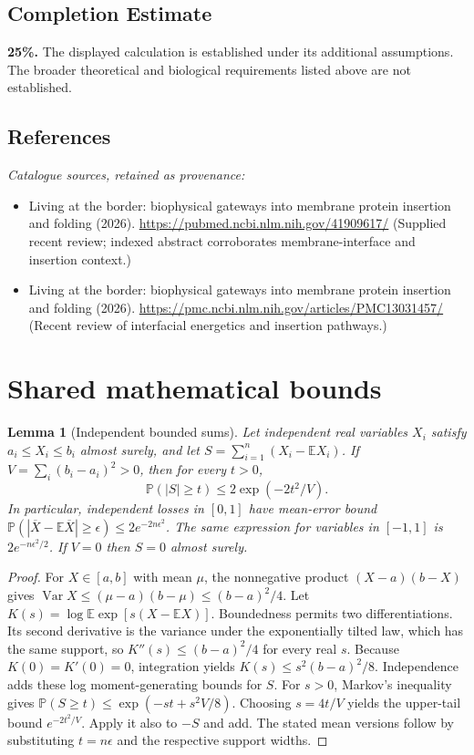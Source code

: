 \documentclass[11pt]{article}
\newcommand{\E}{\mathbb E}
\newcommand{\Prob}{\mathbb P}
\DeclareMathOperator{\Var}{Var}
\providecommand{\E}{\mathbb E}
\providecommand{\Prob}{\mathbb P}
\providecommand{\Var}{\operatorname{Var}}
\newtheorem{sharedlemma}{Lemma}[section]
\begin{document}
\subsection{Completion Estimate}
\textbf{25\%.} The displayed calculation is established under its additional assumptions. The broader theoretical and biological requirements listed above are not established.
\subsection{References}
\noindent\emph{Catalogue sources, retained as provenance:}
\begin{itemize}
\item Living at the border: biophysical gateways into membrane protein insertion and folding (2026). \url{https://pubmed.ncbi.nlm.nih.gov/41909617/} (Supplied recent review; indexed abstract corroborates membrane-interface and insertion context.)
\item Living at the border: biophysical gateways into membrane protein insertion and folding (2026). \url{https://pmc.ncbi.nlm.nih.gov/articles/PMC13031457/} (Recent review of interfacial energetics and insertion pathways.)
\end{itemize}
\clearpage


\appendix
\section{Shared mathematical bounds}\label{app:bounds}
\begin{sharedlemma}[Independent bounded sums]\label{lem:bounded}
Let independent real variables $X_i$ satisfy $a_i\leq X_i\leq b_i$ almost surely,
and let $S=\sum_{i=1}^n(X_i-\E X_i)$. If
$V=\sum_i(b_i-a_i)^2>0$, then for every $t>0$,
\[
 \Prob(|S|\geq t)\leq 2\exp(-2t^2/V).
\]
In particular, independent losses in $[0,1]$ have mean-error bound
$\Prob(|\overline X-\E\overline X|\geq\epsilon)
\leq2e^{-2n\epsilon^2}$. The same expression for variables in $[-1,1]$
is $2e^{-n\epsilon^2/2}$. If $V=0$ then $S=0$ almost surely.
\end{sharedlemma}
\begin{proof}
For $X\in[a,b]$ with mean $\mu$, the nonnegative product
$(X-a)(b-X)$ gives
$\Var X\leq(\mu-a)(b-\mu)\leq(b-a)^2/4$.
Let $K(s)=\log\E\exp[s(X-\E X)]$.
Boundedness permits two differentiations. Its second derivative is the variance
under the exponentially tilted law, which has the same support, so
$K''(s)\leq(b-a)^2/4$ for every real $s$.
Because $K(0)=K'(0)=0$, integration yields
$K(s)\leq s^2(b-a)^2/8$.
Independence adds these log moment-generating bounds for $S$.
For $s>0$, Markov's inequality gives
$\Prob(S\geq t)\leq\exp(-st+s^2V/8)$.
Choosing $s=4t/V$ yields the upper-tail bound $e^{-2t^2/V}$.
Apply it also to $-S$ and add. The stated mean versions follow by substituting
$t=n\epsilon$ and the respective support widths.
\end{proof}
\end{document}
